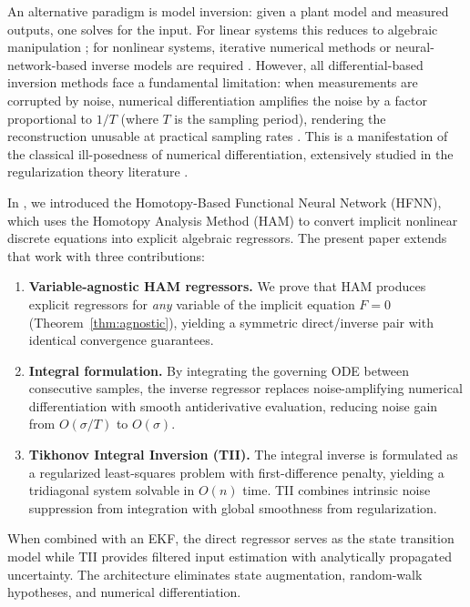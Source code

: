 \documentclass[lettersize,journal]{IEEEtran}
\begin{document}
An alternative paradigm is model inversion: given a plant model and measured outputs, one solves for the input. For linear systems this reduces to algebraic manipulation \cite{moylan1977}; for nonlinear systems, iterative numerical methods or neural-network-based inverse models are required \cite{hunt1996, narendra1990}. However, all differential-based inversion methods face a fundamental limitation: when measurements are corrupted by noise, numerical differentiation amplifies the noise by a factor proportional to $1/T$ (where $T$ is the sampling period), rendering the reconstruction unusable at practical sampling rates \cite{chartrand2011, hanke2001}. This is a manifestation of the classical ill-posedness of numerical differentiation, extensively studied in the regularization theory literature \cite{engl1996, tikhonov1977}.

In \cite{rodrigo2021rpic}, we introduced the Homotopy-Based Functional Neural Network (HFNN), which uses the Homotopy Analysis Method (HAM) \cite{liao2003} to convert implicit nonlinear discrete equations into explicit algebraic regressors. The present paper extends that work with three contributions:

\begin{enumerate}
    \item \textbf{Variable-agnostic HAM regressors.} We prove that HAM produces explicit regressors for \emph{any} variable of the implicit equation $F=0$ (Theorem~\ref{thm:agnostic}), yielding a symmetric direct/inverse pair with identical convergence guarantees.
    
    \item \textbf{Integral formulation.} By integrating the governing ODE between consecutive samples, the inverse regressor replaces noise-amplifying numerical differentiation with smooth antiderivative evaluation, reducing noise gain from $O(\sigma/T)$ to $O(\sigma)$.
    
    \item \textbf{Tikhonov Integral Inversion (TII).} The integral inverse is formulated as a regularized least-squares problem with first-difference penalty, yielding a tridiagonal system solvable in $O(n)$ time. TII combines intrinsic noise suppression from integration with global smoothness from regularization.
\end{enumerate}

When combined with an EKF, the direct regressor serves as the state transition model while TII provides filtered input estimation with analytically propagated uncertainty. The architecture eliminates state augmentation, random-walk hypotheses, and numerical differentiation.
\end{document}
